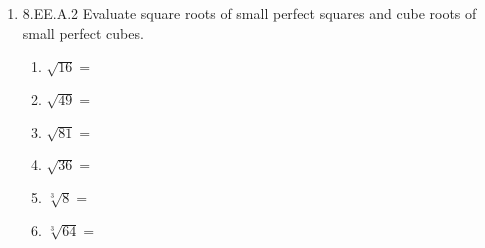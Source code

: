 \documentclass[12pt, twoside]{article}
\begin{document}
\begin{enumerate}[itemsep=0.5cm]
\item 8.EE.A.2 Evaluate square roots of small perfect squares and cube roots of small perfect cubes.
    \begin{multicols}{2}
    \begin{enumerate}[itemsep=0.5cm]
        \item $\sqrt{16}=$
        \item $\sqrt{49}=$
        \item $\sqrt{81}=$
        \item $\sqrt{36}=$
        \item $\sqrt[3]{8}=$
        \item $\sqrt[3]{64}=$
    \end{enumerate}
    \end{multicols}

\end{enumerate}
\end{document}
